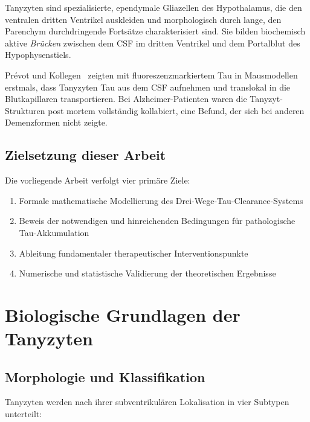 ﻿\documentclass[12pt,a4paper]{article}
\theoremstyle{definition}
\begin{document}
	Tanyzyten sind spezialisierte, ependymale Gliazellen des Hypothalamus, die den ventralen dritten Ventrikel auskleiden und morphologisch durch lange, den Parenchym durchdringende Fortsätze charakterisiert sind. Sie bilden biochemisch aktive \emph{Brücken} zwischen dem CSF im dritten Ventrikel und dem Portalblut des Hypophysenstiels.
	
	Prévot und Kollegen~\cite{Prevot2026} zeigten mit fluoreszenzmarkiertem Tau in Mausmodellen erstmals, dass Tanyzyten Tau aus dem CSF aufnehmen und translokal in die Blutkapillaren transportieren. Bei Alzheimer-Patienten waren die Tanyzyt-Strukturen post mortem vollständig kollabiert, eine Befund, der sich bei anderen Demenzformen nicht zeigte.
	
	\subsection{Zielsetzung dieser Arbeit}
	
	Die vorliegende Arbeit verfolgt vier primäre Ziele:
	\begin{enumerate}[label=(\arabic*)]
		\item Formale mathematische Modellierung des Drei-Wege-Tau-Clearance-Systems
		\item Beweis der notwendigen und hinreichenden Bedingungen für pathologische Tau-Akkumulation
		\item Ableitung fundamentaler therapeutischer Interventionspunkte
		\item Numerische und statistische Validierung der theoretischen Ergebnisse
	\end{enumerate}
	
	\section{Biologische Grundlagen der Tanyzyten}
	
	\subsection{Morphologie und Klassifikation}
	
	Tanyzyten werden nach ihrer subventrikulären Lokalisation in vier Subtypen unterteilt:
	
\end{document}
